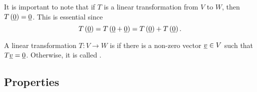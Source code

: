 It is important to note that if $T$ is a linear transformation from $V$ to $W$, then $T \left( \underline{0} \right) = \underline{0}$.
This is essential since
\begin{equation*}
T \left( \underline{0} \right)
= T \left( \underline{0} + \underline{0} \right)
= T \left( \underline{0} \right) + T \left( \underline{0} \right) .
\end{equation*}

\begin{definition}
A linear transformation $T \colon V \rightarrow W$ is  if there is a non-zero vector $\underline{v} \in V$ such that $T \underline{v} = \underline{0}$.
Otherwise, it is called .
\end{definition}

\subsection{Properties}

